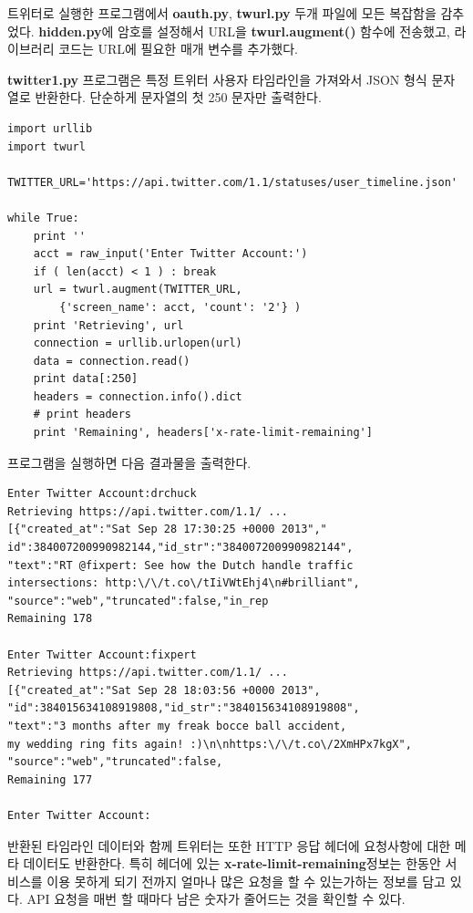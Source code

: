 트위터로 실행한 프로그램에서 {\bf oauth.py}, {\bf twurl.py} 두개 파일에 모든 복잡함을 감추었다.
{\bf hidden.py}에 암호를 설정해서 URL을 {\bf twurl.augment()} 함수에 전송했고,
라이브러리 코드는 URL에 필요한 매개 변수를 추가했다.

{\bf twitter1.py} 프로그램은 특정 트위터 사용자 타임라인을 가져와서 JSON 형식 문자열로 반환한다.
단순하게 문자열의 첫 250 문자만 출력한다.

\beforeverb
\begin{verbatim}
import urllib
import twurl

TWITTER_URL='https://api.twitter.com/1.1/statuses/user_timeline.json'

while True:
    print ''
    acct = raw_input('Enter Twitter Account:')
    if ( len(acct) < 1 ) : break
    url = twurl.augment(TWITTER_URL,
        {'screen_name': acct, 'count': '2'} )
    print 'Retrieving', url
    connection = urllib.urlopen(url)
    data = connection.read()
    print data[:250]
    headers = connection.info().dict
    # print headers
    print 'Remaining', headers['x-rate-limit-remaining']
\end{verbatim}
\afterverb
%

프로그램을 실행하면 다음 결과물을 출력한다.

\beforeverb
\begin{verbatim}
Enter Twitter Account:drchuck
Retrieving https://api.twitter.com/1.1/ ...
[{"created_at":"Sat Sep 28 17:30:25 +0000 2013","
id":384007200990982144,"id_str":"384007200990982144",
"text":"RT @fixpert: See how the Dutch handle traffic 
intersections: http:\/\/t.co\/tIiVWtEhj4\n#brilliant",
"source":"web","truncated":false,"in_rep
Remaining 178

Enter Twitter Account:fixpert
Retrieving https://api.twitter.com/1.1/ ...
[{"created_at":"Sat Sep 28 18:03:56 +0000 2013",
"id":384015634108919808,"id_str":"384015634108919808",
"text":"3 months after my freak bocce ball accident, 
my wedding ring fits again! :)\n\nhttps:\/\/t.co\/2XmHPx7kgX",
"source":"web","truncated":false,
Remaining 177

Enter Twitter Account:
\end{verbatim}
\afterverb
%

반환된 타임라인 데이터와 함께 트위터는 또한 HTTP 응답 헤더에 요청사항에 대한 메타 데이터도 반환한다.
특히 헤더에 있는  {\bf x-rate-limit-remaining}정보는 한동안 서비스를 이용 못하게 되기 전까지 얼마나 많은 요청을 할 수 있는가하는 정보를 담고 있다. 
API 요청을 매번 할 때마다 남은 숫자가 줄어드는 것을 확인할 수 있다.

